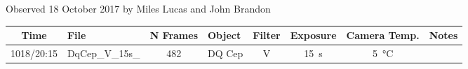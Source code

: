 \caption{Observed 18 October 2017 by Miles Lucas and John Brandon}
\begin{tabular}{clclcccl}
	\hline
	Time  & File            & N Frames & Object & Filter &     Exposure     &      Camera Temp.      & Notes \\ \hline\hline
	1018/20:15 & DqCep\_V\_15s\_ &   482    & DQ Cep &   V    & \SI{15}{\second} & \SI{5}{\degreeCelsius} &  \\ \hline
\end{tabular}